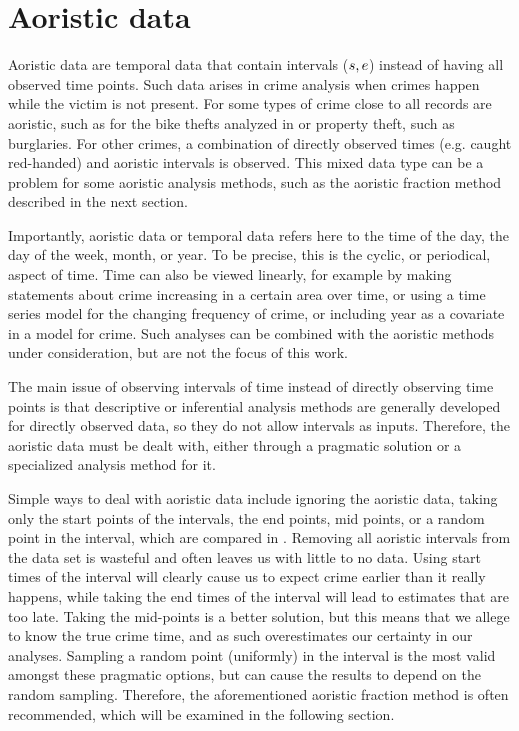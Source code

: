 \section{Aoristic data} \label{aodata}

Aoristic data are temporal data that contain intervals ($s, e$) instead of having all observed time points. Such data arises in crime analysis when crimes happen while the victim is not present. For some types of crime close to all records are aoristic, such as for the bike thefts analyzed in \citet{ashby2013comparison} or property theft, such as burglaries. For other crimes, a combination of directly observed times (e.g. caught red-handed) and aoristic intervals is observed. This mixed data type can be a problem for some aoristic analysis methods, such as the aoristic fraction method described in the next section.

Importantly, aoristic data or temporal data refers here to the time of the day, the day of the week, month, or year. To be precise, this is the cyclic, or periodical, aspect of time. Time can also be viewed linearly, for example by making statements about crime increasing in a certain area over time, or using a time series model for the changing frequency of crime, or including year as a covariate in a model for crime. Such analyses can be combined with the aoristic methods under consideration, but are not the focus of this work.

The main issue of observing intervals of time instead of directly observing time points is that descriptive or inferential analysis methods are generally developed for directly observed data, so they do not allow intervals as inputs. Therefore, the aoristic data must be dealt with, either through a pragmatic solution or a specialized analysis method for it.

Simple ways to deal with aoristic data include ignoring the aoristic data, taking only the start points of the intervals, the end points, mid points, or a random point in the interval, which are compared in \citet{ashby2013comparison}. Removing all aoristic intervals from the data set is wasteful and often leaves us with little to no data. Using start times of the interval will clearly cause us to expect crime earlier than it really happens, while taking the end times of the interval will lead to estimates that are too late. Taking the mid-points is a better solution, but this means that we allege to know the true crime time, and as such overestimates our certainty in our analyses. Sampling a random point (uniformly) in the interval is the most valid amongst these pragmatic options, but can cause the results to depend on the random sampling. Therefore, the aforementioned aoristic fraction method is often recommended, which will be examined in the following section.

